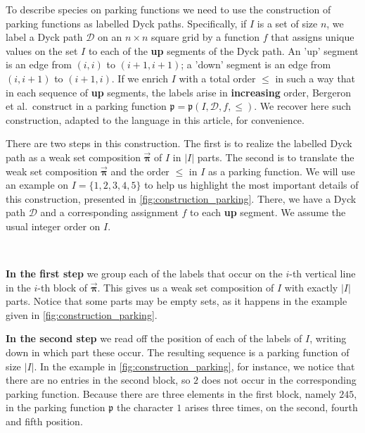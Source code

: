 \documentclass[12pt, reqno]{amsart}
\theoremstyle{definition}
\newcommand{\opi}{\vec{\boldsymbol{\pi}}}
\begin{document}
To describe species on parking functions we need to use the construction of parking functions as labelled Dyck paths.
Specifically, if $I$ is a set of size $n$, we label a Dyck path $\mathcal D$ on an $n\times n$ square grid by a function $f$ that assigns unique values on the set $I$ to each of the \textbf{up} segments of the Dyck path. An 'up' segment is an edge from $(i, i)$ to $(i+1, i+1)$; a 'down' segment is an edge from $(i, i+1)$ to $(i+1, i)$.
If we enrich $I$ with a total order $\leq$ in such a way that in each sequence of \textbf{up} segments, the labels arise in \textbf{increasing} order, Bergeron et al.\ construct in \cite{BGLPV2021} a parking function $\mathfrak{p} = \mathfrak{p}(I, \mathcal D, f, \leq)$.
We recover here such construction, adapted to the language in this article, for convenience.

There are two steps in this construction.
The first is to realize the labelled Dyck path as a weak set composition $\opi$ of $I$ in $|I|$ parts. The second is to translate the weak set composition $\opi$ and the order $\leq $ in $I$ as a parking function.
We will use an example on $I = \{1, 2, 3, 4, 5\}$ to help us highlight the most important details of this construction, presented in \cref{fig:construction_parking}.
There, we have a Dyck path $\mathcal D$ and a corresponding assignment $f$ to each \textbf{up} segment.
We assume the usual integer order on $I$.

\

\textbf{In the first step} we group each of the labels that occur on the $i$-th vertical line in the $i$-th block of $\opi$.
This gives us a weak set composition of $I$ with exactly $|I|$ parts.
Notice that some parts may be empty sets, as it happens in the example given in \cref{fig:construction_parking}.

\textbf{In the second step} we read off the position of each of the labels of $I$, writing down in which part these occur. The resulting sequence is a parking function of size $|I|$.
In the example in \cref{fig:construction_parking}, for instance, we notice that there are no entries in the second block, so $2$ does not occur in the corresponding parking function.
Because there are three elements in the first block, namely $245$, in the parking function $\mathfrak p $ the character $1$ arises three times, on the second, fourth and fifth position.
\end{document}
